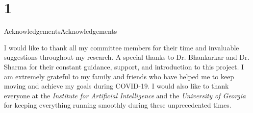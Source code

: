 \chapter{1}{Acknowledgements}{Acknowledgements}
\par I would like to thank all my committee members for their time and invaluable suggestions throughout my research. A special thanks to Dr. Bhankarkar and Dr. Sharma for their constant guidance, support, and introduction to this project. I am extremely grateful to my family and friends who have helped me to keep moving and achieve my goals during COVID-19. I would also like to thank everyone at the \textit{Institute for Artificial Intelligence} and the \textit{University of Georgia} for keeping everything running smoothly during these unprecedented times.


\newpage